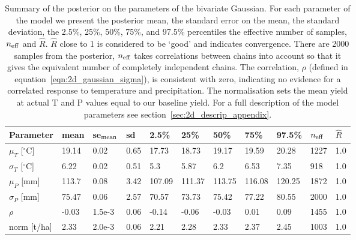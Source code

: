\documentclass[12pt]{article}
\begin{document}
\begin{table}
\centering
\caption{Summary of the posterior on the parameters of the bivariate Gaussian. For each parameter of the model we present the posterior mean, the standard error on the mean, the standard deviation, the 2.5\%, 25\%, 50\%, 75\%, and 97.5\% percentiles the effective number of samples, $n_{\rm eff}$ and $\hat{R}$. $\hat{R}$ close to 1 is considered to be `good' and indicates convergence. There are 2000 samples from the posterior, $n_{\rm eff}$ takes correlations between chains into account so that it gives the equivalent number of completely independent chains. The correlation, $\rho$ (defined in equation~\ref{eqn:2d_gaussian_sigma}), is consistent with zero, indicating no evidence for a correlated response to temperature and precipitation. The normalisation sets the mean yield at actual T and P values equal to our baseline yield. For a full description of the model parameters see section~\ref{sec:2d_descrip_appendix}.}
\label{table:posterior}
\vskip 0.15in
\small
\begin{tabular}{lllllllllll}
Parameter             &  mean  & se$_{\rm mean}$ & sd   & 2.5\%  & 25\%   & 50\%   & 75\%    & 97.5\% & $n_{\rm eff}$ & $\hat{R}$\\
\hline
$\mu_T$ [$^\circ$C]     & 19.14   &   0.02    &   0.65  &  17.73  & 18.73   &  19.17  &   19.59 & 20.28   &    1227 &    1.0\\
$\sigma_T$ [$^\circ$C]  & 6.22    &  0.02     &  0.51   &   5.3   &   5.87  &    6.2  &  6.53   &  7.35   &   918   &    1.0\\
$\mu_P$ [mm]            & 113.7   &   0.08    &   3.42  & 107.09  & 111.37  & 113.75  & 116.08  &  120.25 &  1872   &    1.0\\
$\sigma_P$ [mm]         & 75.47   &   0.06    &  2.57   &  70.57  &  73.73  &  75.42  &  77.22  &  80.55  &  2000   &    1.0\\
$\rho$                  & -0.03   &  1.5e-3   &  0.06   &  -0.14  &  -0.06  &  -0.03  &   0.01  &   0.09  &   1455  &    1.0\\
norm  [t/ha]            & 2.33    &  2.0e-3   &   0.06  &   2.21  &   2.28  &   2.33  &   2.37  &   2.45  &   1003  &    1.0\\
\end{tabular}
\end{table}
\end{document}
